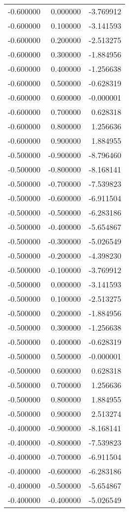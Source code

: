 \begin{tabular}{rrr}
-0.600000 & 0.000000 & -3.769912 \\
-0.600000 & 0.100000 & -3.141593 \\
-0.600000 & 0.200000 & -2.513275 \\
-0.600000 & 0.300000 & -1.884956 \\
-0.600000 & 0.400000 & -1.256638 \\
-0.600000 & 0.500000 & -0.628319 \\
-0.600000 & 0.600000 & -0.000001 \\
-0.600000 & 0.700000 & 0.628318 \\
-0.600000 & 0.800000 & 1.256636 \\
-0.600000 & 0.900000 & 1.884955 \\
-0.500000 & -0.900000 & -8.796460 \\
-0.500000 & -0.800000 & -8.168141 \\
-0.500000 & -0.700000 & -7.539823 \\
-0.500000 & -0.600000 & -6.911504 \\
-0.500000 & -0.500000 & -6.283186 \\
-0.500000 & -0.400000 & -5.654867 \\
-0.500000 & -0.300000 & -5.026549 \\
-0.500000 & -0.200000 & -4.398230 \\
-0.500000 & -0.100000 & -3.769912 \\
-0.500000 & 0.000000 & -3.141593 \\
-0.500000 & 0.100000 & -2.513275 \\
-0.500000 & 0.200000 & -1.884956 \\
-0.500000 & 0.300000 & -1.256638 \\
-0.500000 & 0.400000 & -0.628319 \\
-0.500000 & 0.500000 & -0.000001 \\
-0.500000 & 0.600000 & 0.628318 \\
-0.500000 & 0.700000 & 1.256636 \\
-0.500000 & 0.800000 & 1.884955 \\
-0.500000 & 0.900000 & 2.513274 \\
-0.400000 & -0.900000 & -8.168141 \\
-0.400000 & -0.800000 & -7.539823 \\
-0.400000 & -0.700000 & -6.911504 \\
-0.400000 & -0.600000 & -6.283186 \\
-0.400000 & -0.500000 & -5.654867 \\
-0.400000 & -0.400000 & -5.026549 \\

\end{tabular}

